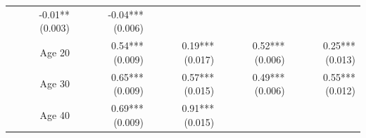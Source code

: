 \documentclass[]{article}
\begin{document}
\begin{longtable}[c]{@{}rrrrr@{}}
\begin{minipage}[t]{0.18\columnwidth}\raggedleft\strut
-0.01** (0.003)
\strut\end{minipage} &
\begin{minipage}[t]{0.15\columnwidth}\raggedleft\strut
-0.04*** (0.006)
\strut\end{minipage}\tabularnewline
\begin{minipage}[t]{0.17\columnwidth}\raggedleft\strut
Age 20
\strut\end{minipage} &
\begin{minipage}[t]{0.20\columnwidth}\raggedleft\strut
0.54*** (0.009)
\strut\end{minipage} &
\begin{minipage}[t]{0.16\columnwidth}\raggedleft\strut
0.19*** (0.017)
\strut\end{minipage} &
\begin{minipage}[t]{0.18\columnwidth}\raggedleft\strut
0.52*** (0.006)
\strut\end{minipage} &
\begin{minipage}[t]{0.15\columnwidth}\raggedleft\strut
0.25*** (0.013)
\strut\end{minipage}\tabularnewline
\begin{minipage}[t]{0.17\columnwidth}\raggedleft\strut
Age 30
\strut\end{minipage} &
\begin{minipage}[t]{0.20\columnwidth}\raggedleft\strut
0.65*** (0.009)
\strut\end{minipage} &
\begin{minipage}[t]{0.16\columnwidth}\raggedleft\strut
0.57*** (0.015)
\strut\end{minipage} &
\begin{minipage}[t]{0.18\columnwidth}\raggedleft\strut
0.49*** (0.006)
\strut\end{minipage} &
\begin{minipage}[t]{0.15\columnwidth}\raggedleft\strut
0.55*** (0.012)
\strut\end{minipage}\tabularnewline
\begin{minipage}[t]{0.17\columnwidth}\raggedleft\strut
Age 40
\strut\end{minipage} &
\begin{minipage}[t]{0.20\columnwidth}\raggedleft\strut
0.69*** (0.009)
\strut\end{minipage} &
\begin{minipage}[t]{0.16\columnwidth}\raggedleft\strut
0.91*** (0.015)
\strut\end{minipage} &

\end{longtable}
\end{document}
